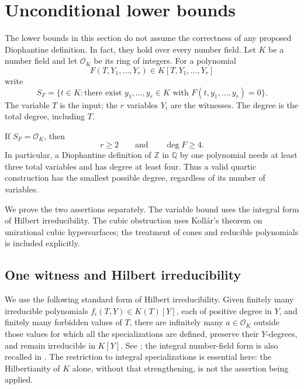 \section{Unconditional lower bounds}
\label{sec:lower-bounds}

The lower bounds in this section do not assume the correctness of any proposed
Diophantine definition.  In fact, they hold over every number field.
Let $K$ be a number field and let $\mathcal O_K$ be its ring of integers.
For a polynomial
\[
 F(T,Y_1,\ldots,Y_r)\in K[T,Y_1,\ldots,Y_r]
\]
write
\[
 S_F=\{t\in K:\text{there exist }y_1,\ldots,y_r\in K
                    \text{ with }F(t,y_1,\ldots,y_r)=0\}.
\]
The variable $T$ is the input; the $r$ variables $Y_i$ are the witnesses.
The degree is the total degree, including $T$.

\begin{theorem}\label{thm:lower-bounds}
If $S_F=\mathcal O_K$, then
\[
                    r\geq 2\qquad\text{and}\qquad\deg F\geq 4.
\]
In particular, a Diophantine definition of $\mathbb Z$ in $\mathbb Q$
by one polynomial needs at least three total variables and has degree at least
four.  Thus a valid quartic construction has the smallest possible degree,
regardless of its number of variables.
\end{theorem}

We prove the two assertions separately.  The variable bound uses the integral
form of Hilbert irreducibility.  The cubic obstruction uses Koll\'ar's theorem
on unirational cubic hypersurfaces; the treatment of cones and reducible
polynomials is included explicitly.

\subsection{One witness and Hilbert irreducibility}

We use the following standard form of Hilbert irreducibility.  Given finitely
many irreducible polynomials $f_i(T,Y)\in K(T)[Y]$, each of positive degree in
$Y$, and finitely many forbidden values of $T$, there are infinitely many
$a\in\mathcal O_K$ outside those values for which all the specializations are
defined, preserve their $Y$-degrees, and remain irreducible in $K[Y]$.
See \cite[Chapter~4, Section~4]{lbSchinzel2000}; the integral number-field
form is also recalled in \cite[Introduction]{lbMuller2001}.
The restriction to integral specializations is essential here: the
Hilbertianity of $K$ alone, without that strengthening, is not the assertion
being applied.

